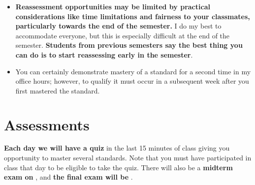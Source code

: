 \documentclass[letterpaper]{article}
\begin{document}
\begin{enumerate}[1)]
\begin{itemize}
\item \textbf{Reassessment opportunities may be limited by practical considerations like time limitations and fairness to your classmates, particularly towards the end of the semester.}  I do my best to accommodate everyone, but this is especially difficult at the end of the semester.  {\bf Students from previous semesters say the best thing you can do is to start reassessing early in the semester}.
\item You can certainly demonstrate mastery of a standard for a second time in my office hours; however, to qualify it must occur in a subsequent week after you first mastered the standard.
\end{itemize}
\end{enumerate}




\section*{\fontsize{12}{15}\selectfont Assessments}
{\bf Each day we will have a quiz} in the last 15 minutes of class giving you opportunity to master several standards.  Note that you must have participated in class that day to be eligible to take the quiz.  There will also be a {\bf midterm exam on }, and {\bf the final exam will be }.
\end{document}
